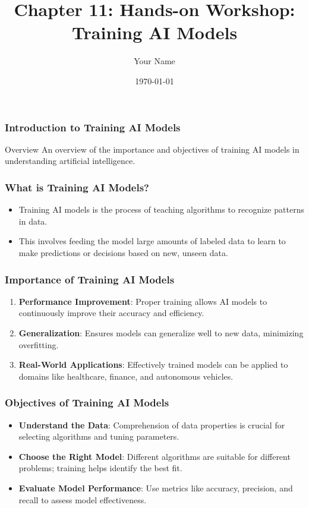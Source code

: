 \documentclass{beamer}
\title{Chapter 11: Hands-on Workshop: Training AI Models}
\author{Your Name}
\institute{Your Institution}
\date{\today}
\begin{document}
\frame{\titlepage}

\begin{frame}[fragile]
    \frametitle{Introduction to Training AI Models}
    \begin{block}{Overview}
        An overview of the importance and objectives of training AI models in understanding artificial intelligence.
    \end{block}
\end{frame}

\begin{frame}[fragile]
    \frametitle{What is Training AI Models?}
    \begin{itemize}
        \item Training AI models is the process of teaching algorithms to recognize patterns in data.
        \item This involves feeding the model large amounts of labeled data to learn to make predictions or decisions based on new, unseen data.
    \end{itemize}
\end{frame}

\begin{frame}[fragile]
    \frametitle{Importance of Training AI Models}
    \begin{enumerate}
        \item \textbf{Performance Improvement}: Proper training allows AI models to continuously improve their accuracy and efficiency.
        \item \textbf{Generalization}: Ensures models can generalize well to new data, minimizing overfitting.
        \item \textbf{Real-World Applications}: Effectively trained models can be applied to domains like healthcare, finance, and autonomous vehicles.
    \end{enumerate}
\end{frame}

\begin{frame}[fragile]
    \frametitle{Objectives of Training AI Models}
    \begin{itemize}
        \item \textbf{Understand the Data}: Comprehension of data properties is crucial for selecting algorithms and tuning parameters.
        \item \textbf{Choose the Right Model}: Different algorithms are suitable for different problems; training helps identify the best fit.
        \item \textbf{Evaluate Model Performance}: Use metrics like accuracy, precision, and recall to assess model effectiveness.
    \end{itemize}
\end{frame}
\end{document}
